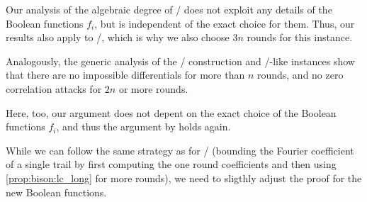 Our analysis of the algebraic degree of \bison/ does not exploit any details of the Boolean functions $f_i$, but is independent of the exact choice for them.
Thus, our results also apply to \wisent/, which is why we also choose $3n$ rounds for this instance.

Analogously, the generic analysis of the \WSN/ construction and \bison/-like instances show that there are no impossible differentials for more than $n$ rounds, and no zero correlation attacks for $2n$ or more rounds.

Here, too, our argument does not depent on the exact choice of the Boolean functions $f_i$, and thus the argument by \textcite{C:BCLR17} holds again.

While we can follow the same strategy as for \bison/ (bounding the Fourier coefficient of a single trail by first computing the one round coefficients and then using \cref{prop:bison:lc_long} for more rounds), we need to sligthly adjust the proof for the new Boolean functions.

